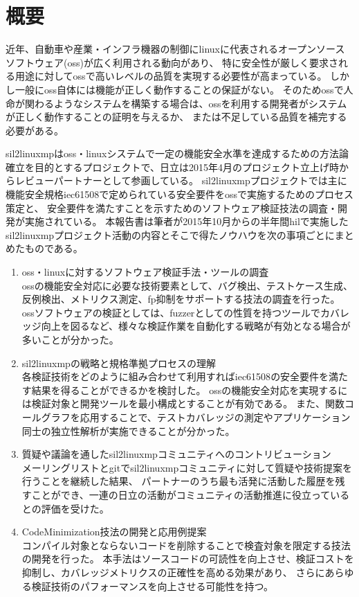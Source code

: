\chapter*{概要}
近年、自動車や産業・インフラ機器の制御に\acrshort{linux}に代表されるオープンソースソフトウェア(\acrshort{oss})が広く利用される動向があり、
特に安全性が厳しく要求される用途に対して\acrshort{oss}で高いレベルの品質を実現する必要性が高まっている。
しかし一般に\acrshort{oss}自体には機能が正しく動作することの保証がない。
そのため\acrshort{oss}で人命が関わるようなシステムを構築する場合は、\acrshort{oss}を利用する開発者がシステムが正しく動作することの証明を与えるか、
または不足している品質を補完する必要がある。
\par
\acrshort{sil2linuxmp}は\acrshort{oss}・\acrshort{linux}システムで一定の機能安全水準を達成するための方法論確立を目的とするプロジェクトで、日立は2015年4月のプロジェクト立上げ時からレビューパートナーとして参画している。
\acrshort{sil2linuxmp}プロジェクトでは主に機能安全規格\acrshort{iec61508}で定められている安全要件を\acrshort{oss}で実施するためのプロセス策定と、
安全要件を満たすことを示すためのソフトウェア検証技法の調査・開発が実施されている。
本報告書は筆者が2015年10月からの半年間\acrlong{hil}で実施した\acrshort{sil2linuxmp}プロジェクト活動の内容とそこで得たノウハウを次の事項ごとにまとめたものである。
\begin{enumerate}
  \item \acrshort{oss}・\acrshort{linux}に対するソフトウェア検証手法・ツールの調査\\
\acrshort{oss}の機能安全対応に必要な技術要素として、バグ検出、テストケース生成、反例検出、メトリクス測定、\acrshort{fp}抑制をサポートする技法の調査を行った。
\acrshort{oss}ソフトウェアの検証としては、\acrshort{fuzzer}としての性質を持つツールでカバレッジ向上を図るなど、様々な検証作業を自動化する戦略が有効となる場合が多いことが分かった。
  \item \acrshort{sil2linuxmp}の戦略と規格準拠プロセスの理解\\
各検証技術をどのように組み合わせて利用すれば\acrshort{iec61508}の安全要件を満たす結果を得ることができるかを検討した。
\acrshort{oss}の機能安全対応を実現するには検証対象と開発ツールを最小構成とすることが有効である。
また、関数コールグラフを応用することで、テストカバレッジの測定やアプリケーション同士の独立性解析が実施できることが分かった。
  \item 質疑や議論を通した\acrshort{sil2linuxmp}コミュニティへのコントリビューション\\
メーリングリストと\acrshort{git}で\acrshort{sil2linuxmp}コミュニティに対して質疑や技術提案を行うことを継続した結果、
パートナーのうち最も活発に活動した履歴を残すことができ、一連の日立の活動がコミュニティの活動推進に役立っているとの評価を受けた。
  \item CodeMinimization技法の開発と応用例提案\\
コンパイル対象とならないコードを削除することで検査対象を限定する技法の開発を行った。
本手法はソースコードの可読性を向上させ、検証コストを抑制し、カバレッジメトリクスの正確性を高める効果があり、
さらにあらゆる検証技術のパフォーマンスを向上させる可能性を持つ。
\end{enumerate}
